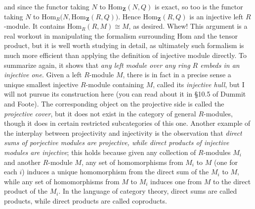 \documentclass[10pt]{article}
\begin{document}
and since the functor taking $N$ to Hom$_{\mathbf Z}(N,Q)$ is exact, so
too is the functor taking $N$ to Hom$_R(N,$Hom$_{\mathbf Z}(R,Q))$.
Hence Hom$_{\mathbf Z}(R,Q)$ is an injective left $R$-module. It
contains Hom$_R(R,M)\cong M$, as desired. Whew! This argument is a real
workout in manipulating the formalism surrounding Hom and the tensor
product, but it is well worth studying in detail, as ultimately such
formalism is much more efficient than applying the definition of
injective module directly. To summarize again, it shows that {\sl any
  left module over any ring $R$ embeds in an injective one}. Given a
left $R$-module $M$, there is in fact in a precise sense a unique
smallest injective $R$-module containing $M$, called its {\sl injective
  hull}, but I will not pursue its construction here (you can read about
it in \S10.5 of Dummit and Foote). The corresponding object on the
projective side is called the {\sl projective cover}, but it does not
exist in the category of general $R$-modules, though it does in certain
restricted subcategories of this one. Another example of the interplay
between projectivity and injectivity is the observation that {\sl direct
  sums of porjective modules are projective, while direct products of
  injective modules are injective}; this holds because given any
collection of $R$-modules $M_i$ and another $R$-module $M$, any set of
homomorphisms from $M_i$ to $M$ (one for each $i$) induces a unique
homomorphism from the direct sum of the $M_i$ to $M$, while any set of
homomorphisms from $M$ to $M_i$ induces one from $M$ to the direct
product of the $M_i$. In the language of category theory, direct sums
are called products, while direct products are called coproducts.
\end{document}
